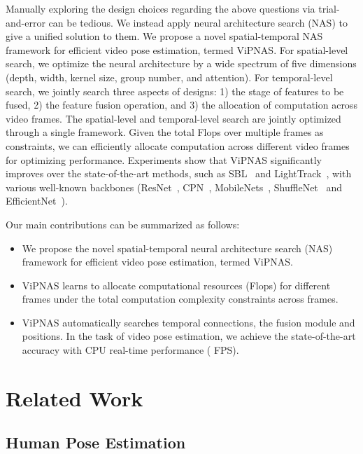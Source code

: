 \documentclass[final]{cvpr}
\begin{document}
Manually exploring the design choices regarding the above questions via trial-and-error can be tedious. We instead apply neural architecture search (NAS) to give a unified solution to them. We propose a novel spatial-temporal NAS framework for efficient video pose estimation, termed ViPNAS. 
For spatial-level search, we optimize the neural architecture by a wide spectrum of five dimensions (depth, width, kernel size, group number, and attention). For temporal-level search, we jointly search three aspects of designs: 1) the stage of features to be fused, 2) the feature fusion operation, and 3) the allocation of computation across video frames. The spatial-level and temporal-level search are jointly optimized through a single framework. Given the total Flops over multiple frames as constraints, we can efficiently allocate computation across different video frames for optimizing performance. Experiments show that ViPNAS significantly improves over the state-of-the-art methods, such as SBL~\cite{xiao2018simple} and LightTrack~\cite{ning2019lighttrack}, with various well-known backbones (ResNet~\cite{he2016deep}, CPN~\cite{chen2018cascaded}, MobileNets~\cite{howard2017mobilenets,howard2019searching}, ShuffleNet~\cite{ma2018shufflenet} and EfficientNet~\cite{tan2019efficientnet}).

Our main contributions can be summarized as follows:
\begin{itemize}
\item We propose the novel spatial-temporal neural architecture search (NAS) framework for efficient video pose estimation, termed ViPNAS. 
\item ViPNAS learns to allocate computational resources (\eg Flops) for different frames under the total computation complexity constraints across frames.
\item ViPNAS automatically searches temporal connections, \ie the fusion module and positions. In the task of video pose estimation, we achieve the state-of-the-art accuracy with CPU real-time performance ( FPS).
\end{itemize}
\section{Related Work}

\subsection{Human Pose Estimation}
\end{document}
